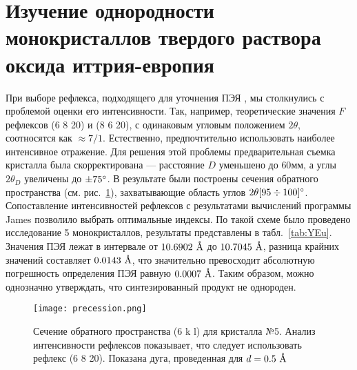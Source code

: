\section{Изучение однородности монокристаллов твердого раствора оксида иттрия-европия}

При выборе рефлекса, подходящего для уточнения ПЭЯ \YEu{}, мы столкнулись с проблемой оценки его интенсивности.
Так, например, теоретические значения $F$ рефлексов \hkl(6 8 20) и \hkl(8 6 20), с одинаковым угловым положением $2\theta$, соотносятся как $\approx 7/1$.
Естественно, предпочтительно использовать наиболее интенсивное отражение.
Для решения этой проблемы предварительная съемка кристалла была скорректирована --- расстояние $D$ уменьшено до $60\unit{мм}$, а углы $2\theta_D$ увеличены до $\pm 75^\circ$.
В результате были построены сечения обратного пространства (см. рис.~\ref{fig:precession}), захватывающие область углов $2\theta [95\div100]^\circ$.
Сопоставление интенсивностей рефлексов с результатами вычислений программы James позволило выбрать оптимальные индексы.
По такой схеме было проведено исследование 5 монокристаллов, результаты представлены в табл.~\ref{tab:YEu}. Значения ПЭЯ лежат в интервале от $10.6902\ \text{\AA}$ до $10.7045\ \text{\AA}$, разница крайних значений составляет $0.0143\ \text{\AA}$, что значительно превосходит абсолютную погрешность определения ПЭЯ равную $0.0007\ \text{\AA}$.
Таким образом, можно однозначно утверждать, что синтезированный продукт не однороден.

\begin{figure}[ht!]
    \centering
    \texttt{[image: precession.png]}
    \caption{
        Сечение обратного пространства \hkl(6 k l) для кристалла №5.
        Анализ интенсивности рефлексов показывает, что следует использовать рефлекс \hkl(6 8 20).
        Показана дуга, проведенная для $d = 0.5\ \text{\AA}$
    }%
    \label{fig:precession}
\end{figure}

